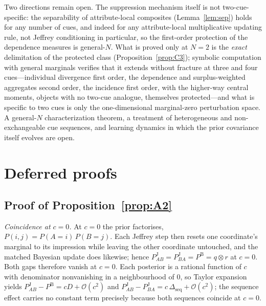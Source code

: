 \documentclass[review,12pt,authoryear]{elsarticle}
\theoremstyle{remark}
\theoremstyle{definition}
\newcommand{\PB}{P^{\mathrm{B}}}
\newcommand{\PJ}{P^{\mathrm{J}}}
\newcommand{\bigO}{\mathcal{O}}
\begin{document}
Two directions remain open. The suppression mechanism itself is not two-cue-specific: the
separability of attribute-local composites (Lemma~\ref{lem:sep}) holds for any number of cues,
and indeed for any attribute-local multiplicative updating rule, not Jeffrey conditioning in
particular, so the first-order protection of the dependence measures is general-$N$. What is
proved only at $N=2$ is the \emph{exact} delimitation of the protected class
(Proposition~\ref{prop:C3}); symbolic computation with general marginals verifies that it
extends without fracture at three and four cues---individual divergence first order, the
dependence and surplus-weighted aggregates second order, the incidence first order, with the
higher-way central moments, objects with no two-cue analogue, themselves protected---and what
is specific to two cues is only the one-dimensional marginal-zero perturbation space. A
general-$N$ characterization theorem, a treatment of heterogeneous and non-exchangeable cue
sequences, and learning dynamics in which the prior covariance itself evolves are open.

\appendix

\section{Deferred proofs}
\label{app:proofs}

\subsection{Proof of Proposition~\ref{prop:A2}}

\emph{Coincidence at $c=0$.} At $c=0$ the prior factorises, $P(i,j)=P(A{=}i)\,P(B{=}j)$. Each
Jeffrey step then resets one coordinate's marginal to its impression while leaving the other
coordinate untouched, and the matched Bayesian update does likewise; hence
$\PJ_{AB}=\PJ_{BA}=\PB=q\otimes r$ at $c=0$. Both gaps therefore vanish at $c=0$. Each posterior
is a rational function of $c$ with denominator nonvanishing in a neighbourhood of $0$, so Taylor
expansion yields $\PJ_{AB}-\PB=cD+\bigO(c^{2})$ and
$\PJ_{AB}-\PJ_{BA}=c\,\Delta_{\mathrm{seq}}+\bigO(c^{2})$; the sequence effect carries no
constant term precisely because both sequences coincide at $c=0$.
\end{document}
